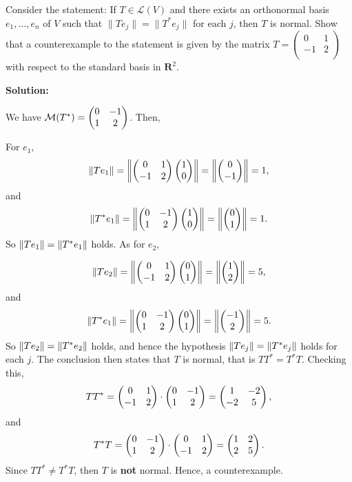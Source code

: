 Consider the statement: If $T \in \mathcal{L}(V)$ and there exists an orthonormal basis $e_1, \ldots , e_n$ of $V$ such that $\|Te_j\| = \|T^*e_j\|$ for each $j$, then $T$ is normal.  Show that a counterexample to the statement is given by the matrix
    $T = \left(
  \begin{array}{cc}
    0 & 1  \\
    -1 & 2  \\
  \end{array}
\right)$ with respect to the standard basis in $\mathbf{R}^2$.

\nnl \textbf{Solution:}

\nl We have $\mathcal M(T^*) = \mat{0}{-1}{1}{2}$. Then,

\nl For $e_1$, 
$$\norm{Te_1} = \norm{ \mat{0}{1}{-1}{2} \vdouble10 } = \norm{ \vdouble{0}{-1} } = 1,$$
and
$$\norm{T^*e_1} = \norm{ \mat{0}{-1}{1}{2} \vdouble10 } = \norm{\vdouble01} = 1.$$
So $\norm{Te_1} = \norm{T^*e_1}$ holds. As for $e_2$,

$$\norm{Te_2} = \norm{ \mat{0}{1}{-1}{2} \vdouble01 } = \norm{ \vdouble12 } = 5,$$
and
$$\norm{T^*e_1} = \norm{ \mat{0}{-1}{1}{2} \vdouble01 } = \norm{\vdouble{-1}{2}} = 5.$$
So $\norm{Te_2} = \norm{T^*e_2}$ holds, and hence the hypothesis $\norm{Te_j} = \norm{T^*e_j}$ holds for each $j$. The conclusion then states that $T$ is normal, that is $TT^* = T^*T$. Checking this,
$$TT^* = \mat{0}{1}{-1}{2} \cdot \mat{0}{-1}{1}{2} = \mat{1}{-2}{-2}{5},$$
and 
$$T^*T = \mat{0}{-1}{1}{2} \cdot \mat{0}{1}{-1}{2} = \mat1225.$$
Since $TT^* \neq T^*T$, then $T$ is \textbf{not} normal. Hence, a counterexample.